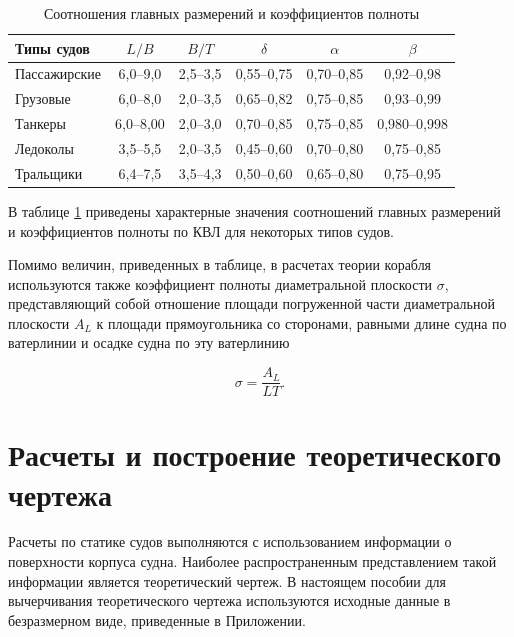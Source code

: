 \begin{table}[h]
    \caption{Соотношения главных размерений и коэффициентов полноты}
    \label{tab:ships}
    \centering
    \small
    \begin{tabular}{ | l | c | c | c | c | c | }
        \hline
        Типы судов & $L/B$ & $B/T$ & $\delta$ & $\alpha$ & $\beta$ \\ [1ex]
        \hline
        Пассажирские & 6,0--9,0 & 2,5--3,5 & 0,55--0,75 & 0,70--0,85 & 0,92--0,98 \\ [1ex]
        Грузовые     & 6,0--8,0 & 2,0--3,5 & 0,65--0,82 & 0,75--0,85 & 0,93--0,99 \\ [1ex]
        Танкеры      & 6,0--8,00 & 2,0--3,0 & 0,70--0,85 & 0,75--0,85 & 0,980--0,998 \\ [1ex]
        Ледоколы & 3,5--5,5 & 2,0--3,5 & 0,45--0,60 & 0,70--0,80 & 0,75--0,85 \\ [1ex]
        Тральщики & 6,4--7,5 & 3,5--4,3 & 0,50--0,60 & 0,65--0,80 & 0,75--0,95 \\ [1ex]
        \hline
    \end{tabular}
\end{table}

В таблице \ref{tab:ships} приведены характерные значения соотношений главных размерений и коэффициентов полноты по КВЛ для некоторых типов судов.

Помимо величин, приведенных в таблице, в расчетах теории корабля используются также коэффициент полноты диаметральной плоскости $\sigma$, представляющий собой отношение площади погруженной части диаметральной плоскости $A_L$ к площади прямоугольника со сторонами, равными длине судна по ватерлинии и осадке судна по эту ватерлинию

\begin{equation}
    \sigma = \frac{A_L}{L T}.
\end{equation}

\section{Расчеты и построение теоретического чертежа}

Расчеты по статике судов выполняются с использованием информации о поверхности корпуса судна.
Наиболее распространенным представлением такой информации является теоретический чертеж.
В настоящем пособии для вычерчивания теоретического чертежа используются исходные данные в безразмерном виде, приведенные в Приложении.

